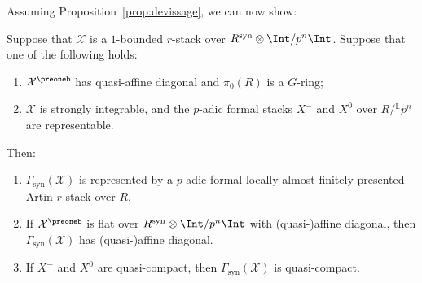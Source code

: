 \documentclass[10pt]{amsart}
\begin{document}
Assuming Proposition~\ref{prop:devissage}, we can now show:
\begin{theorem}
\label{thm:general_representability}
Suppose that $\mathcal{X}$ is a $1$-bounded $r$-stack over $R^{\mathrm{syn}}\otimes\Int/p^n\Int$. Suppose that one of the following holds:
\begin{enumerate}
   \item $\mathcal{X}^\preoneb$ has quasi-affine diagonal and $\pi_0(R)$ is a $G$-ring;
   \item $\mathcal{X}$ is strongly integrable, and the $p$-adic formal stacks $X^{-}$ and $X^{0}$ over $R/{}^{\mathbb{L}}p^n$ are representable.
\end{enumerate}
Then:
\begin{enumerate}
   \item $\Gamma_{\mathrm{syn}}(\mathcal{X})$ is represented by a $p$-adic formal locally almost finitely presented Artin $r$-stack over $R$.
   \item If $\mathcal{X}^\preoneb$ is flat over $R^{\mathrm{syn}}\otimes\Int/p^n\Int$ with (quasi-)affine diagonal, then $\Gamma_{\mathrm{syn}}(\mathcal{X})$ has (quasi-)affine diagonal.
   \item If $X^-$ and $X^0$ are quasi-compact, then $\Gamma_{\mathrm{syn}}(\mathcal{X})$ is quasi-compact.
\end{enumerate}
\end{theorem}
\end{document}
